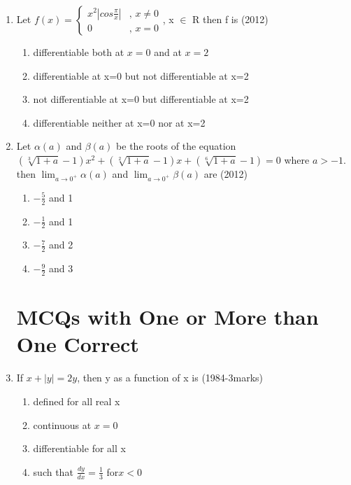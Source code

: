 \documentclass[journal,12pt,twocolumn]{IEEEtran}
\theoremstyle{remark}
\begin{document}
\begin{enumerate}
\item 
Let $f(x) =\begin{cases} x^2|cos \frac{\pi}{x}| & \text{, } x \neq 0 \\ 0 & \text{, } x = 0 
\end{cases}
$, x $\in$ R then f is
\hfill{(2012)} 
\begin{enumerate}[label=\alph*)]
    \item differentiable both at $x=0$ and at $x=2$
    \item differentiable at x=0 but not differentiable at x=2
    \item not differentiable at x=0 but differentiable at x=2
    \item differentiable neither at x=0 nor at x=2 \\
\end{enumerate}

\item 
Let $\alpha(a)$ and $\beta(a)$ be the roots of the equation $(\sqrt[3]{1+a}-1)x^2+(\sqrt[2]{1+a}-1)x+(\sqrt[6]{1+a}-1)=0$ where $a>-1$. then $\lim_{a \to 0^+}{\alpha(a)}$ and $\lim_{a \to 0^+}{\beta(a)}$ are
\hfill{(2012)} 

\begin{enumerate}[label=\alph*)]
    \item $-\frac{5}{2}$ and 1
    \item $-\frac{1}{2}$ and 1
    \item $-\frac{7}{2}$ and 2
    \item $-\frac{9}{2}$ and 3 \\
\end{enumerate}

\section{MCQs with One or More than One Correct}

\item If $x+|y|=2y$, then y as a function of x is
\hfill{(1984-3marks)} 
\begin{enumerate}[label=\alph*)]
    \item defined for all real x
    \item continuous at $x=0$
    \item differentiable for all x
    \item such that $\frac{dy}{dx}=\frac{1}{3}$ for$x<0$ \\
\end{enumerate}


\end{enumerate}
\end{document}

